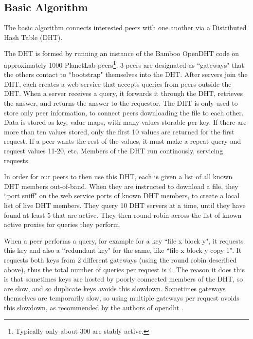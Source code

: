 \subsection{Basic Algorithm}

The basic algorithm connects interested peers with one another via a Distributed Hash Table (DHT).

The DHT is formed by running an instance of the Bamboo OpenDHT code on approximately 1000 PlanetLab peers\footnote{Typically only about 300 are stably active.}.  
3 peers are designated as ``gateways" that the others contact to ``bootstrap" themselves into the DHT.  After servers join the DHT, each 
creates a web service that accepts queries from peers outside the DHT.  When a server receives a
query, it forwards it through the DHT, retrieves the answer, and returns the answer to the requestor. The DHT is only used to store only peer information, 
to connect peers downloading the file to each other.
Data is stored as key, value maps, with many values storable per key.  If there are more than ten values stored, only the first 10 values are returned for the first request. 
If a peer wants the rest of the values, it must make a repeat query and request values 11-20, etc.  Members of the DHT run continously, servicing requests.

In order for our peers to then use this DHT, each is given a list of all known DHT members out-of-band.  When they are instructed to download a file, 
they ``port sniff" on the web service ports of known DHT members, to create a local list of live DHT members.  They query 10 DHT servers at a time, until they have found at least 5 that are active.
They then round robin across the list of known active proxies for queries they perform.

When a peer performs a query, for example for a key ``file x block y", it requests this key and also a ``redundant key" for the same, 
like ``file x block y copy 1".  It requests both keys from 2 different gateways (using the round robin described above), 
thus the total number of queries per request is 4.  
The reason it does this is that sometimes keys are hosted by poorly connected members of the DHT, so are slow, and so duplicate keys avoids this slowdown.
Sometimes gateways themselves are temporarily slow, so using multiple gateways per request avoids this slowdown, as recommended by the authors of opendht \cite{opendht_embarrassing}.

